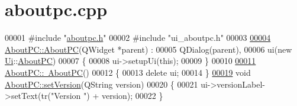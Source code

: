 \hypertarget{aboutpc_8cpp_source}{}\section{aboutpc.\+cpp}
\label{aboutpc_8cpp_source}

\begin{DoxyCode}
00001 \textcolor{preprocessor}{#include "\hyperlink{aboutpc_8h}{aboutpc.h}"}
00002 \textcolor{preprocessor}{#include "ui\_aboutpc.h"}
00003 
\hypertarget{aboutpc_8cpp_source.tex_l00004}{}\hyperlink{class_about_p_c_a89341c4427d97da60acf15dc929ad8a6}{00004} \hyperlink{class_about_p_c_a89341c4427d97da60acf15dc929ad8a6}{AboutPC::AboutPC}(QWidget *parent) :
00005     QDialog(parent),
00006     ui(new \hyperlink{namespace_ui}{Ui}::\hyperlink{class_about_p_c}{AboutPC})
00007 \{
00008     ui->setupUi(\textcolor{keyword}{this});
00009 \}
00010 
\hypertarget{aboutpc_8cpp_source.tex_l00011}{}\hyperlink{class_about_p_c_a3cc0c4c81abc640d946003b078a47dd4}{00011} \hyperlink{class_about_p_c_a3cc0c4c81abc640d946003b078a47dd4}{AboutPC::~AboutPC}()
00012 \{
00013     \textcolor{keyword}{delete} ui;
00014 \}
\hypertarget{aboutpc_8cpp_source.tex_l00019}{}\hyperlink{class_about_p_c_aa3815d4826d0c8d87122449537a0a4d5}{00019} \textcolor{keywordtype}{void} \hyperlink{class_about_p_c_aa3815d4826d0c8d87122449537a0a4d5}{AboutPC::setVersion}(QString version)
00020 \{
00021     ui->versionLabel->setText(tr(\textcolor{stringliteral}{"Version "}) + version);
00022 \}
\end{DoxyCode}
